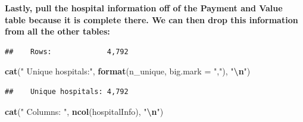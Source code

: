 \documentclass[
]{article}
\newenvironment{Shaded}{\begin{snugshade}}{\end{snugshade}}
\newcommand{\AttributeTok}[1]{\textcolor[rgb]{0.13,0.29,0.53}{#1}}
\newcommand{\DocumentationTok}[1]{\textcolor[rgb]{0.56,0.35,0.01}{\textbf{\textit{#1}}}}
\newcommand{\FunctionTok}[1]{\textcolor[rgb]{0.13,0.29,0.53}{\textbf{#1}}}
\newcommand{\NormalTok}[1]{#1}
\newcommand{\OtherTok}[1]{\textcolor[rgb]{0.56,0.35,0.01}{#1}}
\newcommand{\SpecialCharTok}[1]{\textcolor[rgb]{0.81,0.36,0.00}{\textbf{#1}}}
\newcommand{\StringTok}[1]{\textcolor[rgb]{0.31,0.60,0.02}{#1}}
\begin{document}
\textbf{Lastly, pull the hospital information off of the Payment and
Value table because it is complete there. We can then drop this
information from all the other tables:}

\begin{Shaded}
\end{Shaded}

\begin{verbatim}
##    Rows:             4,792
\end{verbatim}

\begin{Shaded}
\begin{Highlighting}[]
\FunctionTok{cat}\NormalTok{(}\StringTok{"   Unique hospitals:"}\NormalTok{, }\FunctionTok{format}\NormalTok{(n\_unique, }\AttributeTok{big.mark =} \StringTok{","}\NormalTok{), }\StringTok{"}\SpecialCharTok{\textbackslash{}n}\StringTok{"}\NormalTok{)}
\end{Highlighting}
\end{Shaded}

\begin{verbatim}
##    Unique hospitals: 4,792
\end{verbatim}

\begin{Shaded}
\begin{Highlighting}[]
\FunctionTok{cat}\NormalTok{(}\StringTok{"   Columns:         "}\NormalTok{, }\FunctionTok{ncol}\NormalTok{(hospitalInfo), }\StringTok{"}\SpecialCharTok{\textbackslash{}n}\StringTok{"}\NormalTok{)}
\end{Highlighting}
\end{Shaded}
\end{document}
